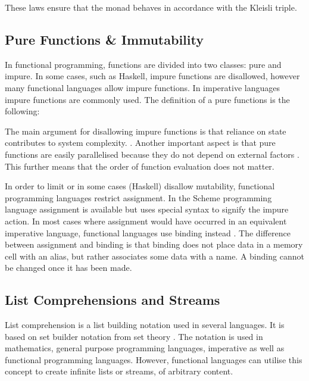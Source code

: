 These laws ensure that the monad behaves in accordance with the Kleisli triple. 

\subsection{Pure Functions \& Immutability}
In functional programming, functions are divided into two classes: pure and impure. In some cases, such as Haskell, impure functions are disallowed, however many functional languages allow impure functions. In imperative languages impure functions are commonly used. The definition of a pure functions is the following:


The main argument for disallowing impure functions is that reliance on state contributes to system complexity. \cite{moseley2006out}. Another important aspect is that pure functions are easily parallelised because they do not depend on external factors \cite{milewski:pure-functions-laziness-io-monads}. This further means that the order of function evaluation does not matter.

In order to limit or in some cases (Haskell) disallow mutability, functional programming languages restrict assignment. In the Scheme programming language assignment is available but uses special syntax to signify the impure action. In most cases where assignment would have occurred in an equivalent imperative language, functional languages use binding instead \cite{milewski:pure-functions-laziness-io-monads}. The difference between assignment and binding is that binding does not place data in a memory cell with an alias, but rather associates some data with a name. A binding cannot be changed once it has been made.

\subsection{List Comprehensions and Streams}
List comprehension is a list building notation used in several languages. It is based on set builder notation from set theory \cite{rosen2011discrete}. The notation is used in mathematics, general purpose programming languages, imperative as well as functional programming languages. However, functional languages can utilise this concept to create infinite lists or streams, of arbitrary content.

